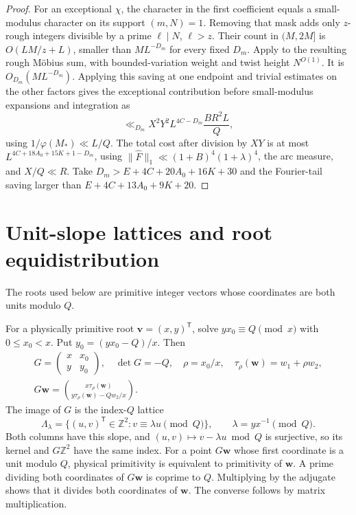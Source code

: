 \documentclass[11pt]{amsart}
\numberwithin{equation}{section}
\theoremstyle{remark}
\begin{document}
\begin{proof}
For an exceptional $\chi$, the character in the first coefficient
equals a small-modulus character on its support $(m,N)=1$. Removing
that mask adds only $z$-rough integers divisible by a prime
$\ell\mid N$, $\ell>z$. Their count in $(M,2M]$ is
$O(LM/z+L)$, smaller than $ML^{-D_m}$ for every fixed $D_m$.
Apply \cite[Proposition~8.1]{Lichtman} to the resulting rough
M\"obius sum, with bounded-variation weight and twist height
$N^{O(1)}$. It is $O_{D_m}(ML^{-D_m})$. Applying this saving at one
endpoint and trivial estimates on the other factors gives the
exceptional contribution before small-modulus expansions and
integration as
\[
 \ll_{D_m} X^2Y^2 L^{4C-D_m}\frac{BR^2 L}{Q},
\]
using $1/\varphi(M_*)\ll L/Q$. The total cost after division by $XY$
is at most $L^{4C+18A_0+15K+1-D_m}$, using
$\|\widehat F\|_1\ll(1+B)^4(1+\lambda)^4$, the arc measure, and
$X/Q\ll R$. Take $D_m>E+4C+20A_0+16K+30$ and the Fourier-tail saving
larger than $E+4C+13A_0+9K+20$.
\end{proof}

\section{Unit-slope lattices and root equidistribution}\label{sec:root-count}

The roots used below are primitive integer vectors whose coordinates
are both units modulo $Q$.

For a physically primitive root $\mathbf v=(x,y)^{\mathsf T}$, solve
$yx_0\equiv Q\pmod{x}$ with $0\leq x_0<x$. Put $y_0=(yx_0-Q)/x$.
Then
\begin{equation}\label{eq:lattice-completion}
\begin{gathered}
 G=\begin{pmatrix}x&x_0\\y&y_0\end{pmatrix},\quad
 \det G=-Q,\quad \rho=x_0/x,\quad
 \tau_\rho(\mathbf w)=w_1+\rho w_2,\\
 G\mathbf w=\binom{x\tau_\rho(\mathbf w)}
                    {y\tau_\rho(\mathbf w)-Qw_2/x}.
\end{gathered}
\end{equation}
The image of $G$ is the index-$Q$ lattice
\[
 \Lambda_\lambda=\{(u,v)^{\mathsf T}\in\mathbb Z^2:
                   v\equiv\lambda u\pmod Q\},
 \qquad \lambda=yx^{-1}\pmod Q .
\]
Both columns have this slope, and $(u,v)\mapsto v-\lambda u\bmod Q$
is surjective, so its kernel and $G\mathbb Z^2$ have the same index.
For a point $G\mathbf w$ whose first coordinate is a unit modulo
$Q$, physical primitivity is equivalent to primitivity of $\mathbf w$.
A prime dividing both coordinates of $G\mathbf w$ is coprime to $Q$.
Multiplying by the adjugate shows that it divides both coordinates
of $\mathbf w$. The converse follows by matrix multiplication.
\end{document}

